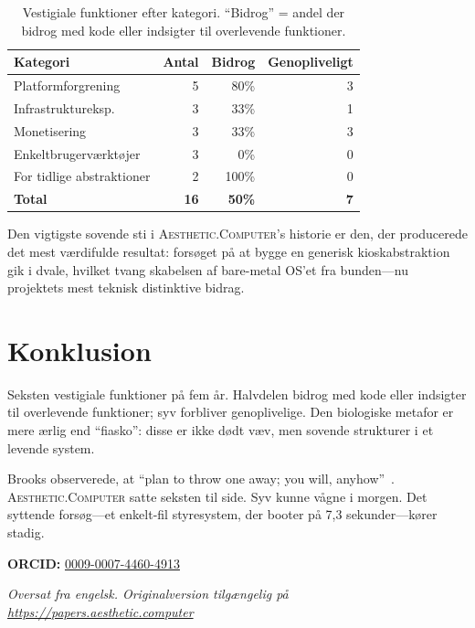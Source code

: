 \documentclass[10pt,letterpaper,twocolumn]{article}
\newcommand{\ac}{\textsc{Aesthetic.Computer}}
\begin{document}
\begin{table}[h]
\small\centering
\begin{tabularx}{\columnwidth}{Xrrr}
\toprule
\textbf{Kategori} & \textbf{Antal} & \textbf{Bidrog} & \textbf{Genopliveligt} \\
\midrule
Platformforgrening & 5 & 80\% & 3 \\
Infrastruktureksp. & 3 & 33\% & 1 \\
Monetisering & 3 & 33\% & 3 \\
Enkeltbrugerværktøjer & 3 & 0\% & 0 \\
For tidlige abstraktioner & 2 & 100\% & 0 \\
\midrule
\textbf{Total} & \textbf{16} & \textbf{50\%} & \textbf{7} \\
\bottomrule
\end{tabularx}
\caption{Vestigiale funktioner efter kategori. ``Bidrog'' = andel der bidrog med kode eller indsigter til overlevende funktioner.}
\label{tab:vestigial}
\end{table}

Den vigtigste sovende sti i \ac{}'s historie er den, der producerede det mest værdifulde resultat: forsøget på at bygge en generisk kioskabstraktion gik i dvale, hvilket tvang skabelsen af bare-metal OS'et fra bunden---nu projektets mest teknisk distinktive bidrag.

\section{Konklusion}

Seksten vestigiale funktioner på fem år. Halvdelen bidrog med kode eller indsigter til overlevende funktioner; syv forbliver genoplivelige. Den biologiske metafor er mere ærlig end ``fiasko'': disse er ikke dødt væv, men sovende strukturer i et levende system.

Brooks observerede, at ``plan to throw one away; you will, anyhow''~\citep{brooks1975mythical}. \ac{} satte seksten til side. Syv kunne vågne i morgen. Det syttende forsøg---et enkelt-fil styresystem, der booter på 7,3 sekunder---kører stadig.

\vspace{0.5em}
\noindent\textbf{ORCID:} \href{https://orcid.org/0009-0007-4460-4913}{0009-0007-4460-4913}

\vspace{0.5em}\noindent\textit{Oversat fra engelsk. Originalversion tilgængelig på \url{https://papers.aesthetic.computer}}



\end{document}
